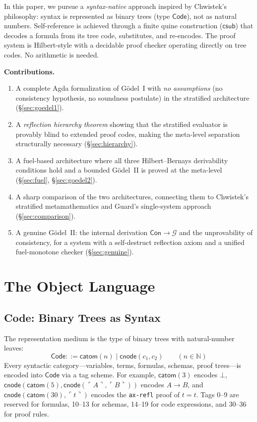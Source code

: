 \documentclass[11pt]{article}
\newcommand{\Code}{\mathsf{Code}}
\newcommand{\Nat}{\mathbb{N}}
\newcommand{\enc}[1]{\ulcorner #1 \urcorner}
\newcommand{\csub}{\mathsf{csub}}
\newcommand{\catom}{\mathsf{catom}}
\newcommand{\cnode}{\mathsf{cnode}}
\newcommand{\fbot}{\bot}
\newcommand{\GS}{\mathcal{G}}
\begin{document}
In this paper, we pursue a \emph{syntax-native} approach inspired by
Chwistek's philosophy: syntax is represented as binary trees (type $\Code$),
not as natural numbers. Self-reference is achieved through a finite quine
construction ($\csub$) that decodes a formula from its tree code, substitutes,
and re-encodes. The proof system is Hilbert-style with a decidable proof
checker operating directly on tree codes. No arithmetic is needed.

\medskip
\noindent\textbf{Contributions.}
\begin{enumerate}[label=(\arabic*),nosep]
  \item A complete Agda formalization of G\"odel~I with \emph{no assumptions}
    (no consistency hypothesis, no soundness postulate) in the stratified
    architecture (\S\ref{sec:goedel1}).
  \item A \emph{reflection hierarchy theorem} showing that the stratified
    evaluator is provably blind to extended proof codes, making the
    meta-level separation structurally necessary (\S\ref{sec:hierarchy}).
  \item A fuel-based architecture where all three Hilbert--Bernays
    derivability conditions hold and a bounded G\"odel~II is proved at
    the meta-level (\S\ref{sec:fuel}, \S\ref{sec:goedel2}).
  \item A sharp comparison of the two architectures, connecting them to
    Chwistek's stratified metamathematics and Guard's single-system
    approach (\S\ref{sec:comparison}).
  \item A genuine G\"odel~II: the internal derivation
    $\mathsf{Con} \to \GS$ and the unprovability of consistency,
    for a system with a self-destruct reflection axiom and a unified
    fuel-monotone checker (\S\ref{sec:genuine}).
\end{enumerate}

\section{The Object Language}
\label{sec:language}

\subsection{Code: Binary Trees as Syntax}

The representation medium is the type of binary trees with natural-number
leaves:
\[
  \Code ::= \catom(n) \mid \cnode(c_1, c_2)
  \qquad (n \in \Nat)
\]
Every syntactic category---variables, terms, formulas, schemas, proof
trees---is encoded into $\Code$ via a tag scheme. For example,
$\catom(3)$ encodes $\fbot$, $\cnode(\catom(5), \cnode(\enc{A}, \enc{B}))$
encodes $A \to B$, and $\cnode(\catom(30), \enc{t})$ encodes the
\texttt{ax-refl} proof of $t = t$. Tags 0--9 are reserved for formulas,
10--13 for schemas, 14--19 for code expressions, and 30--36 for proof
rules.
\end{document}
